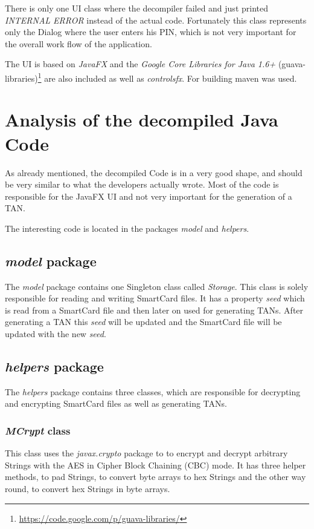 There is only one UI class where the decompiler failed and just printed \textit{INTERNAL ERROR} instead of the actual code. Fortunately this class represents only the Dialog where the user enters his PIN, which is not very important for the overall work flow of the application.

The UI is based on \textit{JavaFX} and the \textit{Google Core Libraries for Java 1.6+} (guava-libraries)\footnote{\url{https://code.google.com/p/guava-libraries/}} are also included as well as \textit{controlsfx}. For building maven was used.

\section{Analysis of the decompiled Java Code}

As already mentioned, the decompiled Code is in a very good shape, and should be very similar to what the developers actually wrote. Most of the code is responsible for the JavaFX UI and not very important for the generation of a TAN.

The interesting code is located in the packages \textit{model} and \textit{helpers}. 

\subsection{\textit{model} package}

The \textit{model} package contains one Singleton class called \textit{Storage}. This class is solely responsible for reading and writing SmartCard files. It has a property \textit{seed} which is read from a SmartCard file and then later on used for generating TANs. After generating a TAN this \textit{seed} will be updated and the SmartCard file will be updated with the new \textit{seed}.

\subsection{\textit{helpers} package}

The \textit{helpers} package contains three classes, which are responsible for decrypting and encrypting SmartCard files as well as generating TANs.

\subsubsection{\textit{MCrypt} class}

This class uses the \textit{javax.crypto} package to to encrypt and decrypt arbitrary Strings with the AES in Cipher Block Chaining (CBC) mode. It has three helper methods, to pad Strings, to convert byte arrays to hex Strings and the other way round, to convert hex Strings in byte arrays.


